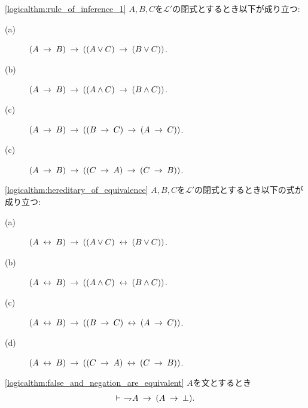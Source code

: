	\begin{screen}
		\begin{logicalthm}[含意は遺伝する]
		\ref{logicalthm:rule_of_inference_1}
			$A,B,C$を$\mathcal{L}'$の閉式とするとき以下が成り立つ:
			\begin{description}
				\item[(a)] $(A \rarrow B) \rarrow ( (A \vee C) \rarrow (B \vee C) )$.
				
				\item[(b)] $(A \rarrow B) \rarrow ( (A \wedge C) \rarrow (B \wedge C) )$.
				
				\item[(c)] $(A \rarrow B) \rarrow ( (B \rarrow C) \rarrow (A \rarrow C) )$.
				
				\item[(c)] $(A \rarrow B) \rarrow ( (C \rarrow A) \rarrow (C \rarrow B) )$.
			\end{description}
		\end{logicalthm}
	\end{screen}
	
	\begin{screen}
		\begin{logicalthm}[同値記号の遺伝性質]
		\ref{logicalthm:hereditary_of_equivalence}
			$A,B,C$を$\mathcal{L}'$の閉式とするとき以下の式が成り立つ:
			\begin{description}
				\item[(a)] $(A \lrarrow B) \rarrow ((A \vee C) \lrarrow (B \vee C))$.
				\item[(b)] $(A \lrarrow B) \rarrow ((A \wedge C) \lrarrow (B \wedge C))$.
				\item[(c)] $(A \lrarrow B) \rarrow ((B \rarrow C) \lrarrow (A \rarrow C))$.
				
				\item[(d)] $(A \lrarrow B) \rarrow ((C \rarrow A) \lrarrow (C \rarrow B))$.
			\end{description}
		\end{logicalthm}
	\end{screen}
	
	\begin{screen}
		\begin{logicalthm}[偽な式は矛盾を導く]
		\ref{logicalthm:false_and_negation_are_equivalent}
			$A$を文とするとき
			\begin{align}
				\vdash\ \negation A \rarrow (A \rarrow \bot).
			\end{align}
		\end{logicalthm}
	\end{screen}
	
